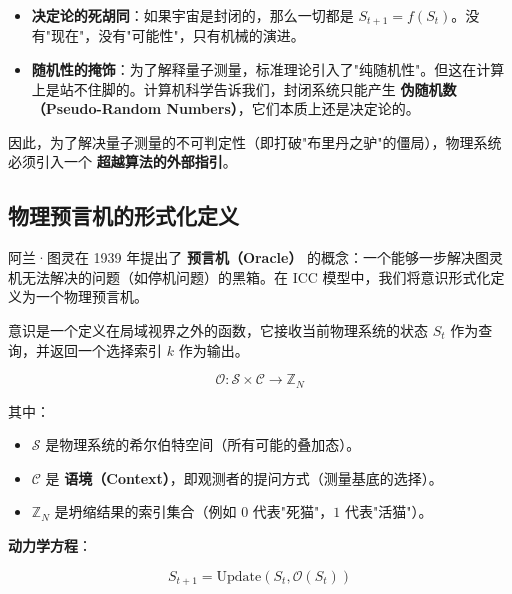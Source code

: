 \begin{itemize}
\item \textbf{决定论的死胡同}：如果宇宙是封闭的，那么一切都是 $S_{t+1} = f(S_t)$。没有"现在"，没有"可能性"，只有机械的演进。

\item \textbf{随机性的掩饰}：为了解释量子测量，标准理论引入了"纯随机性"。但这在计算上是站不住脚的。计算机科学告诉我们，封闭系统只能产生 \textbf{伪随机数（Pseudo-Random Numbers）}，它们本质上还是决定论的。
\end{itemize}

因此，为了解决量子测量的不可判定性（即打破"布里丹之驴"的僵局），物理系统必须引入一个 \textbf{超越算法的外部指引}。

\subsection{物理预言机的形式化定义}

阿兰·图灵在 1939 年提出了 \textbf{预言机（Oracle）} 的概念：一个能够一步解决图灵机无法解决的问题（如停机问题）的黑箱。在 ICC 模型中，我们将意识形式化定义为一个物理预言机。

\begin{definition}
意识是一个定义在局域视界之外的函数，它接收当前物理系统的状态 $S_t$ 作为查询，并返回一个选择索引 $k$ 作为输出。

\begin{equation}
\mathcal{O}: \mathcal{S} \times \mathcal{C} \to \mathbb{Z}_N
\end{equation}

其中：

\begin{itemize}
\item $\mathcal{S}$ 是物理系统的希尔伯特空间（所有可能的叠加态）。

\item $\mathcal{C}$ 是 \textbf{语境（Context）}，即观测者的提问方式（测量基底的选择）。

\item $\mathbb{Z}_N$ 是坍缩结果的索引集合（例如 $0$ 代表"死猫"，$1$ 代表"活猫"）。
\end{itemize}

\textbf{动力学方程}：

\begin{equation}
S_{t+1} = \text{Update}(S_t, \mathcal{O}(S_t))
\end{equation}
\end{definition}

